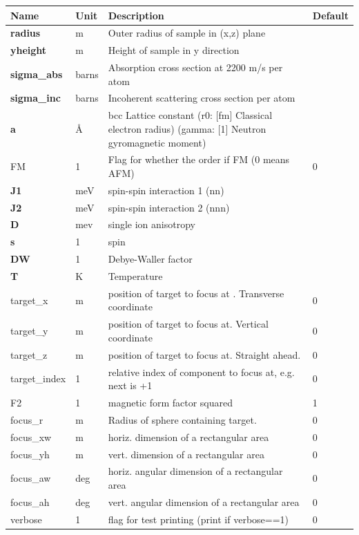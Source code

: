 \begin{longtable}{p{}p{}p{}p{}}
\toprule
\textbf{Name} & \textbf{Unit} & \textbf{Description} & \textbf{Default} \\
\midrule
\endhead
\textbf{radius} & m & Outer radius of sample in (x,z) plane &  \\
\textbf{yheight} & m & Height of sample in y direction &  \\
\textbf{sigma\_abs} & barns & Absorption cross section at 2200 m/s per atom &  \\
\textbf{sigma\_inc} & barns & Incoherent scattering cross section per atom &  \\
\textbf{a} & \AA{} & bcc Lattice constant (r0: [fm]            Classical electron radius) (gamma: [1]           Neutron gyromagnetic moment) &  \\
FM & 1 & Flag for whether the order if FM (0 means AFM) & 0 \\
\textbf{J1} & meV & spin-spin interaction 1 (nn) &  \\
\textbf{J2} & meV & spin-spin interaction 2 (nnn) &  \\
\textbf{D} & mev & single ion anisotropy &  \\
\textbf{s} & 1 & spin &  \\
\textbf{DW} & 1 & Debye-Waller factor &  \\
\textbf{T} & K & Temperature &  \\
target\_x & m & position of target to focus at . Transverse coordinate & 0 \\
target\_y & m & position of target to focus at. Vertical coordinate & 0 \\
target\_z & m & position of target to focus at. Straight ahead. & 0 \\
target\_index & 1 & relative index of component to focus at, e.g. next is +1 & 0 \\
F2 & 1 & magnetic form factor squared & 1 \\
focus\_r & m & Radius of sphere containing target. & 0 \\
focus\_xw & m & horiz. dimension of a rectangular area & 0 \\
focus\_yh & m & vert.  dimension of a rectangular area & 0 \\
focus\_aw & deg & horiz. angular dimension of a rectangular area & 0 \\
focus\_ah & deg & vert.  angular dimension of a rectangular area & 0 \\
verbose & 1 & flag for test printing (print if verbose==1) & 0 \\
\bottomrule
\end{longtable}

